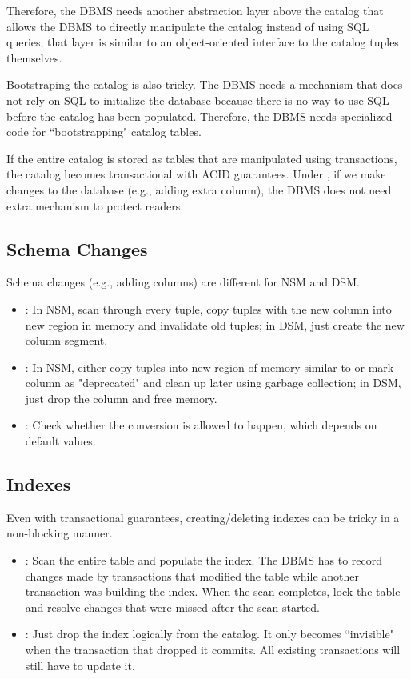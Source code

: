 \documentclass[11pt]{article}
\begin{document}
Therefore, the DBMS needs another abstraction layer above the catalog that allows the DBMS to directly manipulate the catalog instead of using SQL queries; that layer is similar to an object-oriented interface to the catalog tuples themselves. 

Bootstraping the catalog is also tricky. The DBMS needs a mechanism that does not rely on SQL to initialize the database because there is no way to use SQL before the catalog has been populated. Therefore, the DBMS needs specialized code for ``bootstrapping" catalog tables. 

If the entire catalog is stored as tables that are manipulated using transactions, the catalog becomes transactional with ACID guarantees. Under , if we make changes to the database (e.g., adding extra column),  the DBMS does not need extra mechanism to protect readers.

\subsection*{Schema Changes}
Schema changes (e.g., adding columns) are different for NSM and DSM.
\begin{itemize}
    \item {}: In NSM, scan through every tuple, copy tuples with the new column into new region in memory and invalidate old tuples; in DSM, just create the new column segment.
    \item {}: In NSM, either copy tuples into new region of memory similar to  or mark column as "deprecated" and clean up later using garbage collection; in DSM, just drop the column and free memory.
    \item {}: Check whether the conversion is allowed to happen, which depends on default values.
\end{itemize}

\subsection*{Indexes}
Even with transactional guarantees, creating/deleting indexes can be tricky in a non-blocking manner. 
\begin{itemize}
    \item {}: Scan the entire table and populate the index. The DBMS has to record changes made by transactions that modified the table while another transaction was building the index. When the scan completes, lock the table and resolve changes that were missed after the scan started.
    \item {}: Just drop the index logically from the catalog. It only becomes ``invisible" when the transaction that dropped it commits. All existing transactions will still have to update it.
\end{itemize}
\end{document}
